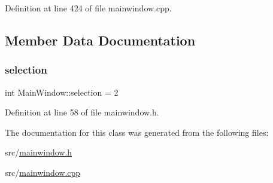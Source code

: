 Definition at line 424 of file mainwindow.\+cpp.



\subsection{Member Data Documentation}
\mbox{\label{class_main_window_a911848dbb7d268519126fd35326d8f44}} 
\subsubsection{\texorpdfstring{selection}{selection}}
{\footnotesize\ttfamily int Main\+Window\+::selection = 2\hspace{0.3cm}{\ttfamily [static]}}



Definition at line 58 of file mainwindow.\+h.



The documentation for this class was generated from the following files\+:\begin{DoxyCompactItemize}
\item 
src/\mbox{\hyperlink{mainwindow_8h}{mainwindow.\+h}}\item 
src/\mbox{\hyperlink{mainwindow_8cpp}{mainwindow.\+cpp}}\end{DoxyCompactItemize}
